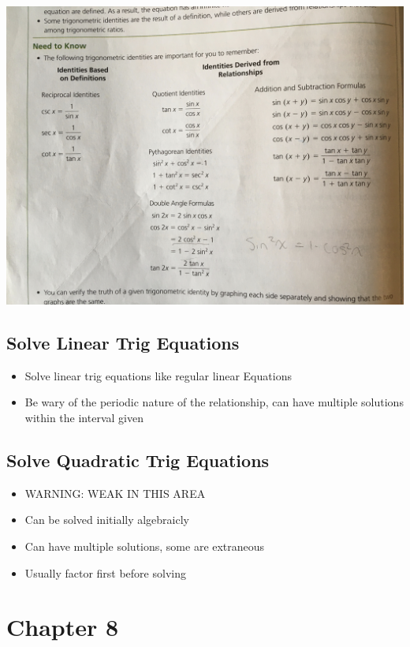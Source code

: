 \documentclass{article}
\begin{document}
    \includegraphics[width=\linewidth]{IMG_0836.JPG}

    \subsection{Solve Linear Trig Equations}
    \begin{itemize}
        \item Solve linear trig equations like regular linear Equations
        \item Be wary of the periodic nature of the relationship, can have multiple solutions within the interval given
    \end{itemize}

    \subsection{Solve Quadratic Trig Equations}
    \begin{itemize}
        \item WARNING: WEAK IN THIS AREA 
        \item Can be solved initially algebraicly
        \item Can have multiple solutions, some are extraneous
        \item Usually factor first before solving
    \end{itemize}

    \section{Chapter 8}
\end{document}
